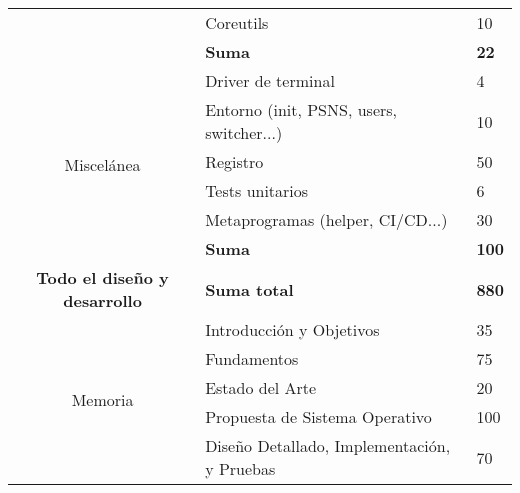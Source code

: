 \begin{table}[]
\begin{tabular}{|c|l|l|}
                                        & Coreutils                                       & 10                                            \\ \cline{2-3} 
                                        & \textbf{Suma}                                   & \textbf{22}                                   \\ \hline
\multirow{6}{*}{Miscelánea}             & Driver de terminal                              & 4                                             \\ \cline{2-3} 
                                        & Entorno (init, PSNS, users, switcher...)        & 10                                            \\ \cline{2-3} 
                                        & Registro                                        & 50                                            \\ \cline{2-3} 
                                        & Tests unitarios                                 & 6                                             \\ \cline{2-3} 
                                        & Metaprogramas (helper, CI/CD...)                & 30                                            \\ \cline{2-3} 
                                        & \textbf{Suma}                                   & \textbf{100}                                  \\ \hline
\textbf{Todo el diseño y desarrollo}    & \textbf{Suma total}                             & \textbf{880}                                  \\ \hline
\multirow{7}{*}{Memoria}                & Introducción y Objetivos                        & 35                                            \\ \cline{2-3} 
                                        & Fundamentos                                     & 75                                            \\ \cline{2-3} 
                                        & Estado del Arte                                 & 20                                            \\ \cline{2-3} 
                                        & Propuesta de Sistema Operativo                  & 100                                           \\ \cline{2-3} 
                                        & Diseño Detallado, Implementación, y Pruebas     & 70                                            \\ \cline{2-3} 

\end{tabular}
\end{table}
